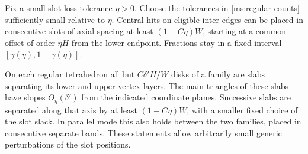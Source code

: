 \begin{lemma}
\label{ms:slots}
Fix a small slot-loss tolerance $\eta>0$.  Choose the tolerances in
\eqref{ms:regular-counts} sufficiently small relative to $\eta$.
Central hits on eligible inter-edges can be placed in consecutive
slots of axial spacing at least $(1-C\eta)W$, starting at a common
offset of order $\eta H$ from the lower endpoint.  Fractions stay
in a fixed interval $[\gamma(\eta),1-\gamma(\eta)]$.

On each regular tetrahedron all but $C\delta'H/W$ disks of a family
are slabs separating its lower and upper vertex layers.  The main
triangles of these slabs have slopes $O_\eta(\delta')$ from the
indicated coordinate planes.  Successive slabs are separated along
that axis by at least $(1-C\eta)W$, with a smaller fixed choice of
the slot slack.  In parallel mode this also holds between the two
families, placed in consecutive separate bands.  These statements
allow arbitrarily small generic perturbations of the slot positions.
\end{lemma}

